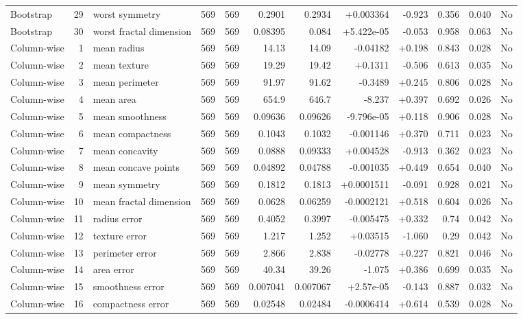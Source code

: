 \begin{landscape}
\begin{longtable}{@{}lrp{4.0cm}rrrrrrrrr@{}}
Bootstrap & 29 & worst symmetry & 569 & 569 & 0.2901 & 0.2934 & +0.003364 & -0.923 & 0.356 & 0.040 & No \\
Bootstrap & 30 & worst fractal dimension & 569 & 569 & 0.08395 & 0.084 & +5.422e-05 & -0.053 & 0.958 & 0.063 & No \\
Column-wise & 1 & mean radius & 569 & 569 & 14.13 & 14.09 & -0.04182 & +0.198 & 0.843 & 0.028 & No \\
Column-wise & 2 & mean texture & 569 & 569 & 19.29 & 19.42 & +0.1311 & -0.506 & 0.613 & 0.035 & No \\
Column-wise & 3 & mean perimeter & 569 & 569 & 91.97 & 91.62 & -0.3489 & +0.245 & 0.806 & 0.028 & No \\
Column-wise & 4 & mean area & 569 & 569 & 654.9 & 646.7 & -8.237 & +0.397 & 0.692 & 0.026 & No \\
Column-wise & 5 & mean smoothness & 569 & 569 & 0.09636 & 0.09626 & -9.796e-05 & +0.118 & 0.906 & 0.028 & No \\
Column-wise & 6 & mean compactness & 569 & 569 & 0.1043 & 0.1032 & -0.001146 & +0.370 & 0.711 & 0.023 & No \\
Column-wise & 7 & mean concavity & 569 & 569 & 0.0888 & 0.09333 & +0.004528 & -0.913 & 0.362 & 0.023 & No \\
Column-wise & 8 & mean concave points & 569 & 569 & 0.04892 & 0.04788 & -0.001035 & +0.449 & 0.654 & 0.040 & No \\
Column-wise & 9 & mean symmetry & 569 & 569 & 0.1812 & 0.1813 & +0.0001511 & -0.091 & 0.928 & 0.021 & No \\
Column-wise & 10 & mean fractal dimension & 569 & 569 & 0.0628 & 0.06259 & -0.0002121 & +0.518 & 0.604 & 0.026 & No \\
Column-wise & 11 & radius error & 569 & 569 & 0.4052 & 0.3997 & -0.005475 & +0.332 & 0.74 & 0.042 & No \\
Column-wise & 12 & texture error & 569 & 569 & 1.217 & 1.252 & +0.03515 & -1.060 & 0.29 & 0.042 & No \\
Column-wise & 13 & perimeter error & 569 & 569 & 2.866 & 2.838 & -0.02778 & +0.227 & 0.821 & 0.046 & No \\
Column-wise & 14 & area error & 569 & 569 & 40.34 & 39.26 & -1.075 & +0.386 & 0.699 & 0.035 & No \\
Column-wise & 15 & smoothness error & 569 & 569 & 0.007041 & 0.007067 & +2.57e-05 & -0.143 & 0.887 & 0.032 & No \\
Column-wise & 16 & compactness error & 569 & 569 & 0.02548 & 0.02484 & -0.0006414 & +0.614 & 0.539 & 0.028 & No \\

\end{longtable}
\end{landscape}
